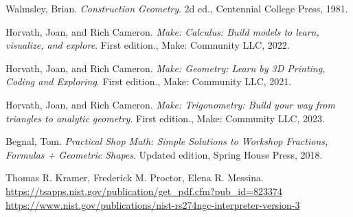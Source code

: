 \documentclass{ltxdoc}
\begin{document}
\begin{thebibliography}{PractShopMath}

Walmsley, Brian. \emph{Construction Geometry}. 2d ed., Centennial College Press, 1981.
 
Horvath, Joan, and Rich Cameron. 
\emph{Make: Calculus: Build models to learn, visualize, and explore}. First edition., 
Make: Community LLC, 2022.
 
Horvath, Joan, and Rich Cameron. 
\emph{Make: Geometry: Learn by 3D Printing, Coding and Exploring}. First edition., 
Make: Community LLC, 2021.

Horvath, Joan, and Rich Cameron. 
\emph{Make: Trigonometry: Build your way from triangles to analytic geometry}. First edition., 
Make: Community LLC, 2023.
 
Begnal, Tom. \emph{Practical Shop Math: Simple Solutions to Workshop Fractions, Formulas + Geometric Shapes}. Updated edition, Spring House Press, 2018.
 
Thomas R. Kramer, Frederick M. Proctor, Elena R. Messina.\\
\mbox{\url{https://tsapps.nist.gov/publication/get_pdf.cfm?pub_id=823374}}\\
\url{https://www.nist.gov/publications/nist-rs274ngc-interpreter-version-3}

\end{thebibliography}



\DoNotIndex{\\\\,\\~,\n,\Users,\RapCAD}
 
\PrintIndex

\end{document}
